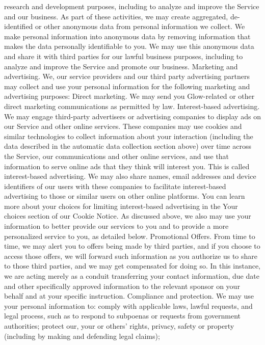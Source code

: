 research and development purposes, including to analyze and improve
the Service and our business. As part of these activities, we may create
aggregated, de-identified or other anonymous data from personal
information we collect. We make personal information into anonymous
data by removing information that makes the data personally identifiable
to you. We may use this anonymous data and share it with third parties
for our lawful business purposes, including to analyze and improve the
Service and promote our business.
Marketing and advertising. We, our service providers and our third
party advertising partners may collect and use your personal
information for the following marketing and advertising purposes:
Direct marketing. We may send you Glow-related or other direct
marketing communications as permitted by law.
Interest-based advertising. We may engage third-party advertisers
or advertising companies to display ads on our Service and other
online services. These companies may use cookies and similar
technologies to collect information about your interaction (including
the data described in the automatic data collection section above)
over time across the Service, our communications and other online
services, and use that information to serve online ads that they
think will interest you. This is called interest-based advertising. We
may also share names, email addresses and device identifiers of
our users with these companies to facilitate interest-based
advertising to those or similar users on other online platforms. You
can learn more about your choices for limiting interest-based
advertising in the Your choices section of our Cookie Notice.
As discussed above, we also may use your information to better
provide our services to you and to provide a more personalized
service to you, as detailed below.
Promotional Offers. From time to time, we may alert you to offers being
made by third parties, and if you choose to access those offers, we will
forward such information as you authorize us to share to those third
parties, and we may get compensated for doing so. In this instance, we
are acting merely as a conduit transferring your contact information, due
date and other specifically approved information to the relevant sponsor
on your behalf and at your specific instruction.
Compliance and protection. We may use your personal information to:
comply with applicable laws, lawful requests, and legal process,
such as to respond to subpoenas or requests from government
authorities;
protect our, your or others’ rights, privacy, safety or property
(including by making and defending legal claims);
